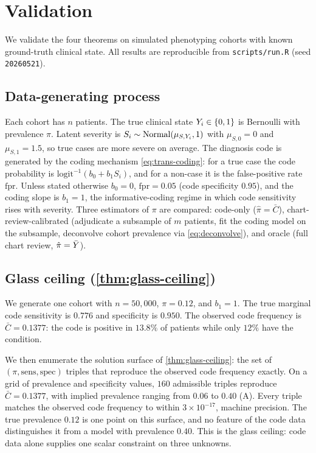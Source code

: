 \section{Validation}
\label{sec:validation}

We validate the four theorems on simulated phenotyping cohorts with
known ground-truth clinical state. All results are reproducible from
\texttt{scripts/run.R} (seed \texttt{20260521}).

\subsection{Data-generating process}

Each cohort has $n$ patients. The true clinical state $Y_i \in
\{0,1\}$ is Bernoulli with prevalence $\pi$. Latent severity is $S_i
\sim \mathrm{Normal}(\mu_{S,Y_i}, 1)$ with $\mu_{S,0} = 0$ and
$\mu_{S,1} = 1.5$, so true cases are more severe on average. The
diagnosis code is generated by the coding mechanism
\eqref{eq:trans-coding}: for a true case the code probability is
$\mathrm{logit}^{-1}(b_0 + b_1 S_i)$, and for a non-case it is the
false-positive rate $\mathrm{fpr}$. Unless stated otherwise $b_0 = 0$,
$\mathrm{fpr} = 0.05$ (code specificity $0.95$), and the coding slope
is $b_1 = 1$, the informative-coding regime in which code sensitivity
rises with severity. Three estimators of $\pi$ are compared: code-only
($\hat\pi = \bar C$), chart-review-calibrated (adjudicate a subsample
of $m$ patients, fit the coding model on the subsample, deconvolve
cohort prevalence via \eqref{eq:deconvolve}), and oracle (full chart
review, $\hat\pi = \bar{Y}$).

\subsection{Glass ceiling (\cref{thm:glass-ceiling})}

We generate one cohort with $n = 50{,}000$, $\pi = 0.12$, and $b_1 =
1$. The true marginal code sensitivity is $0.776$ and specificity is
$0.950$. The observed code frequency is $\bar C = 0.1377$: the code is
positive in $13.8\%$ of patients while only $12\%$ have the condition.

We then enumerate the solution surface of \cref{thm:glass-ceiling}: the
set of $(\pi, \mathrm{sens}, \mathrm{spec})$ triples that reproduce the
observed code frequency exactly. On a grid of prevalence and
specificity values, $160$ admissible triples reproduce $\bar C =
0.1377$, with implied prevalence ranging from $0.06$ to $0.40$
(A). Every triple matches the observed code frequency
to within $3 \times 10^{-17}$, machine precision. The true prevalence
$0.12$ is one point on this surface, and no feature of the code data
distinguishes it from a model with prevalence $0.40$. This is the glass
ceiling: code data alone supplies one scalar constraint on three
unknowns.

